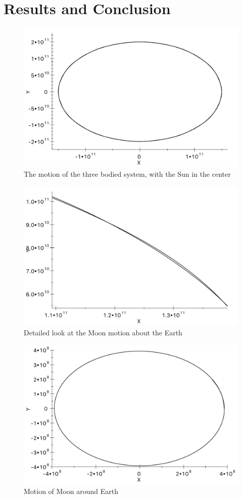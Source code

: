 \documentclass[12pt,letterpaper,notitlepage]{article}
\begin{document}
\section{Results and Conclusion}	
	\begin{figure}[H]
		\includegraphics[width=1.\textwidth]{looper.pdf}
		\caption{The motion of the three bodied system, with the Sun in the center}
	\end{figure}  
	\begin{figure}[H]
		\includegraphics[width=1.\textwidth]{zoomlooper.pdf}
		\caption{Detailed look at the Moon motion about the Earth} 
	\end{figure}  
	\begin{figure}[H]
		\includegraphics[width=1.\textwidth]{smalllooper.pdf}
		\caption{Motion of Moon around Earth} 
	\end{figure} 
\end{document}
